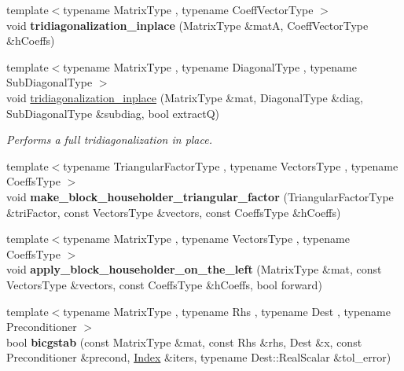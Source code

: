 \begin{DoxyCompactItemize}
\item 
\mbox{\label{namespace_eigen_1_1internal_a59076b7f3fda3580d0d8fdc34481b385}} 
{\footnotesize template$<$typename Matrix\+Type , typename Coeff\+Vector\+Type $>$ }\\void {\bfseries tridiagonalization\+\_\+inplace} (Matrix\+Type \&matA, Coeff\+Vector\+Type \&h\+Coeffs)
\item 
{\footnotesize template$<$typename Matrix\+Type , typename Diagonal\+Type , typename Sub\+Diagonal\+Type $>$ }\\void \hyperlink{namespace_eigen_1_1internal_aa53570cf2e676b41631f08397658ca0f}{tridiagonalization\+\_\+inplace} (Matrix\+Type \&mat, Diagonal\+Type \&diag, Sub\+Diagonal\+Type \&subdiag, bool extractQ)
\begin{DoxyCompactList}\small\item\em Performs a full tridiagonalization in place. \end{DoxyCompactList}\item 
\mbox{\label{namespace_eigen_1_1internal_a25fb10863f558539b3a6de4d382b46e4}} 
{\footnotesize template$<$typename Triangular\+Factor\+Type , typename Vectors\+Type , typename Coeffs\+Type $>$ }\\void {\bfseries make\+\_\+block\+\_\+householder\+\_\+triangular\+\_\+factor} (Triangular\+Factor\+Type \&tri\+Factor, const Vectors\+Type \&vectors, const Coeffs\+Type \&h\+Coeffs)
\item 
\mbox{\label{namespace_eigen_1_1internal_aa4f23e8e0e68dae24dfef3d535aed89f}} 
{\footnotesize template$<$typename Matrix\+Type , typename Vectors\+Type , typename Coeffs\+Type $>$ }\\void {\bfseries apply\+\_\+block\+\_\+householder\+\_\+on\+\_\+the\+\_\+left} (Matrix\+Type \&mat, const Vectors\+Type \&vectors, const Coeffs\+Type \&h\+Coeffs, bool forward)
\item 
\mbox{\label{namespace_eigen_1_1internal_a3e9559d1e9c7b034925dd44b6f164f71}} 
{\footnotesize template$<$typename Matrix\+Type , typename Rhs , typename Dest , typename Preconditioner $>$ }\\bool {\bfseries bicgstab} (const Matrix\+Type \&mat, const Rhs \&rhs, Dest \&x, const Preconditioner \&precond, \hyperlink{namespace_eigen_a62e77e0933482dafde8fe197d9a2cfde}{Index} \&iters, typename Dest\+::\+Real\+Scalar \&tol\+\_\+error)

\end{DoxyCompactItemize}

